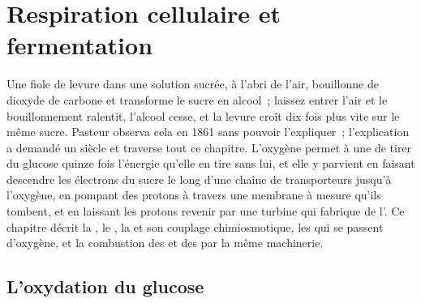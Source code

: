 \chapter{Respiration cellulaire et fermentation}\label{ch:b1:respiration-fermentation}

Une fiole de levure dans une solution sucrée, à l'abri de l'air,
bouillonne de dioxyde de carbone et transforme le sucre en alcool~;
laissez entrer l'air et le bouillonnement ralentit, l'alcool cesse, et
la levure croît dix fois plus vite sur le même sucre. Pasteur observa
cela en 1861 sans pouvoir l'expliquer~; l'explication a demandé un
siècle et traverse tout ce chapitre. L'oxygène permet à une  de
tirer du glucose quinze fois l'énergie qu'elle en tire sans lui, et
elle y parvient en faisant descendre les électrons du sucre le long
d'une chaîne de transporteurs jusqu'à l'oxygène, en pompant des protons
à travers une membrane à mesure qu'ils tombent, et en laissant les
protons revenir par une turbine qui fabrique de l'. Ce chapitre
décrit la , le , la  et son
couplage chimiosmotique, les  qui se passent d'oxygène, et
la combustion des  et des  par la même machinerie.

\section{L'oxydation du glucose}

